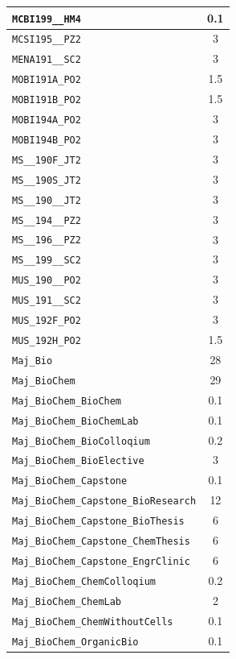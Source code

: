 \begin{longtable}{|p{}|c|}
    \verb|MCBI199__HM4| & 0.1\\\hline
    \verb|MCSI195__PZ2| & 3\\\hline
    \verb|MENA191__SC2| & 3\\\hline
    \verb|MOBI191A_PO2| & 1.5\\\hline
    \verb|MOBI191B_PO2| & 1.5\\\hline
    \verb|MOBI194A_PO2| & 3\\\hline
    \verb|MOBI194B_PO2| & 3\\\hline
    \verb|MS__190F_JT2| & 3\\\hline
    \verb|MS__190S_JT2| & 3\\\hline
    \verb|MS__190__JT2| & 3\\\hline
    \verb|MS__194__PZ2| & 3\\\hline
    \verb|MS__196__PZ2| & 3\\\hline
    \verb|MS__199__SC2| & 3\\\hline
    \verb|MUS_190__PO2| & 3\\\hline
    \verb|MUS_191__SC2| & 3\\\hline
    \verb|MUS_192F_PO2| & 3\\\hline
    \verb|MUS_192H_PO2| & 1.5\\\hline
    \verb|Maj_Bio| & 28\\\hline
    \verb|Maj_BioChem| & 29\\\hline
    \verb|Maj_BioChem_BioChem| & 0.1\\\hline
    \verb|Maj_BioChem_BioChemLab| & 0.1\\\hline
    \verb|Maj_BioChem_BioColloqium| & 0.2\\\hline
    \verb|Maj_BioChem_BioElective| & 3\\\hline
    \verb|Maj_BioChem_Capstone| & 0.1\\\hline
    \verb|Maj_BioChem_Capstone_BioResearch| & 12\\\hline
    \verb|Maj_BioChem_Capstone_BioThesis| & 6\\\hline
    \verb|Maj_BioChem_Capstone_ChemThesis| & 6\\\hline
    \verb|Maj_BioChem_Capstone_EngrClinic| & 6\\\hline
    \verb|Maj_BioChem_ChemColloqium| & 0.2\\\hline
    \verb|Maj_BioChem_ChemLab| & 2\\\hline
    \verb|Maj_BioChem_ChemWithoutCells| & 0.1\\\hline
    \verb|Maj_BioChem_OrganicBio| & 0.1\\\hline

\end{longtable}
